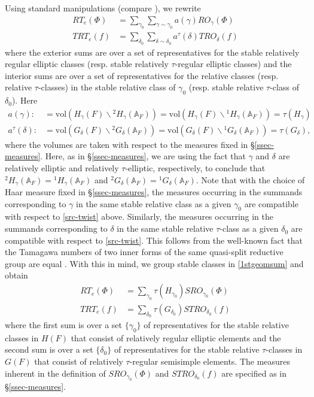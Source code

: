 \documentclass[12pt]{amsart}
\theoremstyle{remark}
\numberwithin{equation}{section}
\newcommand{\A}{\mathbb{A}}
\theoremstyle{definition}
\numberwithin{equation}{subsection}
\begin{document}
 Using standard manipulations (compare \cite{Hahn}), we rewrite
\begin{align} \label{1stgeomsum}
RT_e(\Phi)&=\sum_{\gamma_0} \sum_{\gamma \sim \gamma_0} a(\gamma)RO_{\gamma}(\Phi)\\
\nonumber TRT_e(f)&=\sum_{\delta_0} \sum_{\delta \sim \delta_0}a^{\tau}(\delta)TRO_{\delta}(f)
\end{align}
where the exterior sums are over a set of representatives for the stable relatively regular elliptic classes (resp. stable relatively $\tau$-regular elliptic classes) and the interior sums are over a set of
representatives for the relative classes (resp. relative $\tau$-classes) in the stable relative
class of $\gamma_0$ (resp. stable relative $\tau$-class of $\delta_0$).
Here
\begin{align}
a(\gamma):&=\mathrm{vol}(H_{\gamma}(F)\backslash {}^{2}H_{\gamma}(\A_F))=\mathrm{vol}(H_{\gamma}(F)\backslash {}^{1}H_{\gamma}(\A_F))=\tau(H_{\gamma})\\
\nonumber a^{\tau}(\delta):&=\mathrm{vol}(G_{\delta}(F)
\backslash {}^{2}G_{\delta}(\A_F))=\mathrm{vol}(
G_{\delta}(F)
\backslash {}^{1}G_{\delta}(\A_F))=\tau(G_{\delta}),
\end{align}where the volumes are taken with respect to the measures fixed in \S \ref{ssec-measures}.
Here, as in \S \ref{ssec-measures}, we are using the fact that $\gamma$ and $\delta$ are relatively elliptic and relatively $\tau$-elliptic, respectively, to conclude that ${}^2H_{\gamma}(\A_F)={}^1H_{\gamma}(\A_F)$ and ${}^2G_{\delta}(\A_F)={}^1G_{\delta}(\A_F)$.
Note that with the choice of Haar measure fixed in \S \ref{ssec-measures},
the measures occurring in the summands corresponding to $\gamma$
in the same stable relative class as a given $\gamma_0$ are compatible with respect to \eqref{src-twist} above.
Similarly, the measures occurring in the summands corresponding to
 $\delta$ in the same stable relative $\tau$-class as a given $\delta_0$ are compatible with respect to \eqref{src-twist}.
This follows from the well-known fact
that the Tamagawa numbers of two inner forms of the same quasi-split reductive group are equal \cite{KottTama} \cite{Cherno}.  With this in mind, we group stable classes in \eqref{1stgeomsum} and obtain
\begin{align} \label{RT-st-gp}
RT_e(\Phi)&=\sum_{\gamma_0} \tau(H_{\gamma_0}) SRO_{\gamma_0}(\Phi)\\
\nonumber TRT_e(f)&=\sum_{\delta_0} \tau(G_{\delta_0}) STRO_{\delta_0}(f)
\end{align}
where the first sum is over a set $\{\gamma_0\}$ of representatives for the stable relative classes in $H(F)$ that consist of relatively regular elliptic elements
and the second sum is over a set $\{\delta_0\}$ of representatives for the stable relative $\tau$-classes in $G(F)$ that consist of  relatively $\tau$-regular semisimple elements.  The measures inherent in the definition of $SRO_{\gamma_0}(\Phi)$ and $STRO_{\delta_0}(f)$ are specified as in \S \ref{ssec-measures}.
\end{document}
